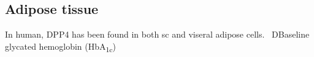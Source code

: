 \subsection{Adipose tissue}
In human, DPP4 has been found in both sc and viseral adipose cells.~\cite{Lamers2011} DBaseline glycated hemoglobin (HbA\textsubscript{1c}) 